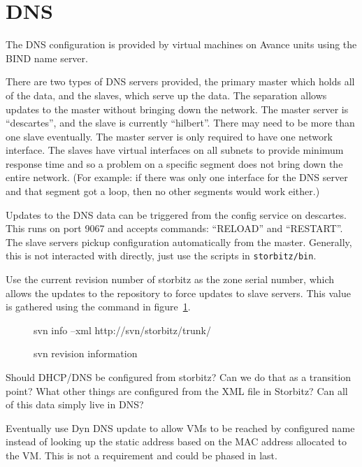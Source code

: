 \documentclass[twoside]{article}
\begin{document}
\section{DNS}

The DNS configuration is provided by virtual machines on Avance units
using the BIND name server.

There are two types of DNS servers provided, the primary master which holds all of the
data, and the slaves, which serve up the data.
The separation allows updates to the master without bringing down the network.
The master server is ``descartes'', and the slave is currently ``hilbert''.
There may need to be more than one slave eventually.
The master server is only required to have one network interface.
The slaves have virtual interfaces on all subnets to provide minimum response time
and so a problem on a specific segment does not bring down the entire network.
(For example: if there was only one interface for the DNS server and that
segment got a loop, then no other segments would work either.)

Updates to the DNS data can be triggered from the config service
on descartes.  This runs on port 9067 and accepts commands: ``RELOAD'' and ``RESTART''.
The slave servers pickup configuration automatically from the master.
Generally, this is not interacted with directly,
just use the scripts in \verb+storbitz/bin+.

Use the current revision number of storbitz as the zone serial number,
which allows the updates to the repository to force updates to slave servers.
This value is gathered using the command in figure~\ref{svn:revision}.

\begin{figure}[!h]
\begin{center}
\begin{boxedverbatim}
svn info --xml http://svn/storbitz/trunk/
\end{boxedverbatim}
\end{center}
\caption{svn revision information}\label{svn:revision}
\end{figure}

Should DHCP/DNS be configured from storbitz?
Can we do that as a transition point?
What other things are configured from the XML file in Storbitz?
Can all of this data simply live in DNS?

Eventually use Dyn DNS update to allow VMs to be reached by configured name
instead of looking up the static address based on the MAC address allocated 
to the VM.
This is not a requirement and could be phased in last.
\end{document}
